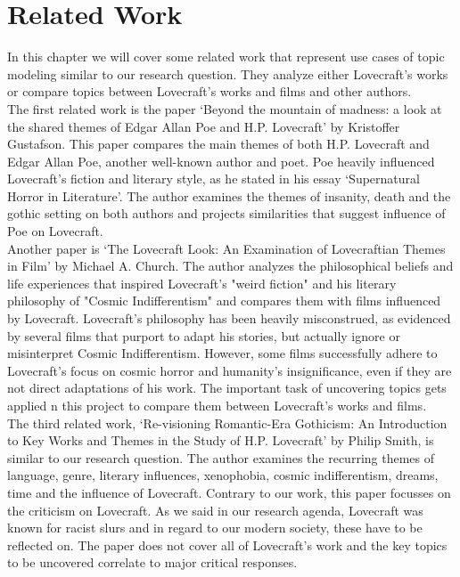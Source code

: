 \section{Related Work}

In this chapter we will cover some related work that represent use cases of topic modeling 
similar to our research question. They analyze either Lovecraft’s works or compare topics 
between Lovecraft’s works and films and other authors.\\

The first related work is the paper ‘Beyond the mountain of madness: a look at the shared 
themes of Edgar Allan Poe and H.P. Lovecraft’ by Kristoffer Gustafson. This paper compares 
the main themes of both H.P. Lovecraft and Edgar Allan Poe, another well-known author and 
poet. Poe heavily influenced Lovecraft’s fiction and literary style, as he stated in his 
essay ‘Supernatural Horror in Literature’. The author examines the themes of insanity, 
death and the gothic setting on both authors and projects similarities that suggest influence 
of Poe on Lovecraft.\\

Another paper is ‘The Lovecraft Look: An Examination of Lovecraftian Themes in Film’ by 
Michael A. Church. The author analyzes the philosophical beliefs and life experiences that 
inspired Lovecraft's "weird fiction" and his literary philosophy of "Cosmic Indifferentism" 
and compares them with films influenced by Lovecraft. Lovecraft's philosophy has been 
heavily misconstrued, as evidenced by several films that purport to adapt his stories, 
but actually ignore or misinterpret Cosmic Indifferentism. However, some films successfully 
adhere to Lovecraft's focus on cosmic horror and humanity's insignificance, even if they 
are not direct adaptations of his work. The important task of uncovering topics gets applied 
n this project to compare them between Lovecraft’s works and films.\\

The third related work, ‘Re-visioning Romantic-Era Gothicism: An Introduction to Key Works 
and Themes in the Study of H.P. Lovecraft’ by Philip Smith, is similar to our research 
question. The author examines the recurring themes of language, genre, literary influences, 
xenophobia, cosmic indifferentism, dreams, time and the influence of Lovecraft. Contrary 
to our work, this paper focusses on the criticism on Lovecraft. As we said in our research 
agenda, Lovecraft was known for racist slurs and in regard to our modern society, these 
have to be reflected on. The paper does not cover all of Lovecraft’s work and the key 
topics to be uncovered correlate to major critical responses.\\